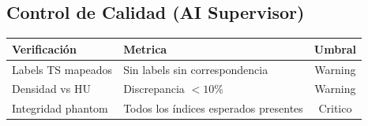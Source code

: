 \documentclass[12pt,a4paper]{article}
\begin{document}
\begin{tcolorbox}[aiSupervisor]
\subsection*{Control de Calidad (AI Supervisor)}

\begin{table}[H]
\centering
\begin{tabular}{llc}
\toprule
\textbf{Verificación} & \textbf{Metrica} & \textbf{Umbral} \\
\midrule
Labels TS mapeados & Sin labels sin correspondencia & Warning \\
Densidad vs HU & Discrepancia $< 10\%$ & Warning \\
Integridad phantom & Todos los índices esperados presentes & Critico \\
\bottomrule
\end{tabular}
\end{table}

\newpage


\newpage


\newpage


\newpage


\newpage


\newpage


\newpage


\newpage

\end{tcolorbox}
\end{document}
